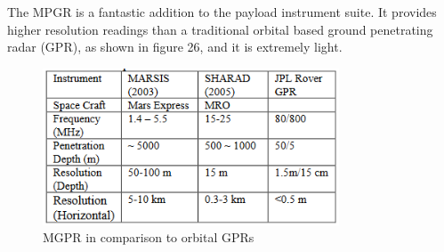 \documentclass[%
 portrait,
 aapm,
 mph,%
 amsmath,amssymb,
 reprint,%
]{revtex4-2}
\begin{document}
The MPGR is a fantastic addition to the payload instrument suite. It provides higher resolution readings than a traditional orbital based ground penetrating radar (GPR), as shown in figure 26, and it is extremely light. 
\begin{figure}[h!]
  \includegraphics[width=250pt]{Instruments/5_1_1_MGPRcompare.png}
   \caption{MGPR in comparison to orbital GPRs \cite{kim2012miniature}}
\end{figure} 
\end{document}
